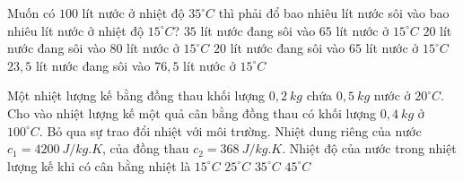 \begin{ex}
	Muốn có $100$ lít nước ở nhiệt độ $35^\circ C$ thì phải đổ bao nhiêu lít nước sôi vào bao nhiêu lít nước ở nhiệt độ $15^\circ C$?
	\choice
	{$35$ lít nước đang sôi vào $65$ lít nước ở $15^\circ C$}
	{$20$ lít nước đang sôi vào $80$ lít nước ở $15^\circ C$}
	{$20$ lít nước đang sôi vào $65$ lít nước ở $15^\circ C$}
	{\True $23,5$ lít nước đang sôi vào $76,5$ lít nước ở $15^\circ C$}
	
	\end{ex}
\begin{ex}%
	Một nhiệt lượng kế bằng đồng thau khối lượng $0,2\ kg$ chứa $0,5\ kg$ nước ở $20^{\circ} C$. Cho vào nhiệt lượng kế một quả cân bằng đồng thau có khối lượng $0,4 \ kg$ ở $100^{\circ} C$. Bỏ qua sự trao đổi nhiệt với môi trường. Nhiệt dung riêng của nước $c_1 = 4200\ J/kg.K$, của đồng thau $c_2 = 368\ J/kg.K$. Nhiệt độ của nước trong nhiệt lượng kế khi có cân bằng nhiệt là
	\choice
	{$15^{\circ}C$}
	{\True $25^{\circ}C$}
	{$35^{\circ}C$}
	{$45^{\circ}C$}
	\end{ex}
